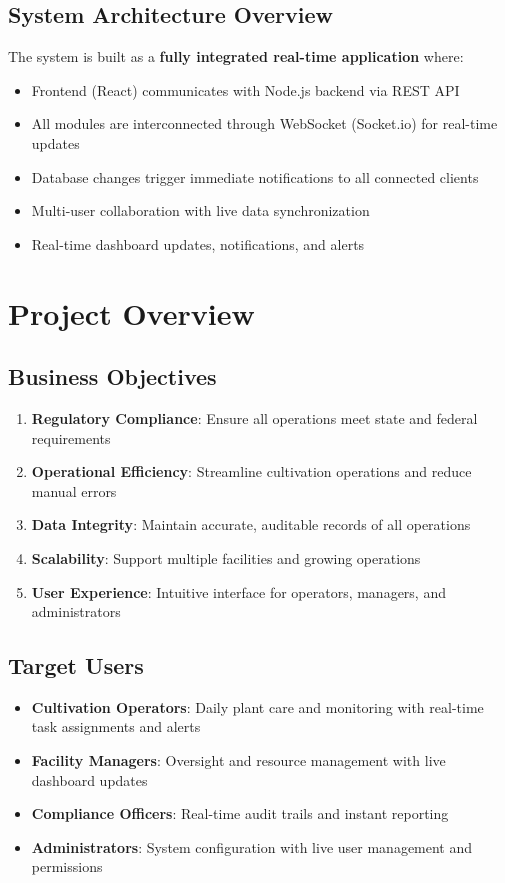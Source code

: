 \documentclass[11pt,a4paper]{article}
\begin{document}
\subsection*{System Architecture Overview}
\begin{highlightbox}
The system is built as a \textbf{fully integrated real-time application} where:
\begin{itemize}
    \item Frontend (React) communicates with Node.js backend via REST API
    \item All modules are interconnected through WebSocket (Socket.io) for real-time updates
    \item Database changes trigger immediate notifications to all connected clients
    \item Multi-user collaboration with live data synchronization
    \item Real-time dashboard updates, notifications, and alerts
\end{itemize}
\end{highlightbox}

\section{Project Overview}

\subsection{Business Objectives}
\begin{enumerate}
    \item \textbf{Regulatory Compliance}: Ensure all operations meet state and federal requirements
    \item \textbf{Operational Efficiency}: Streamline cultivation operations and reduce manual errors
    \item \textbf{Data Integrity}: Maintain accurate, auditable records of all operations
    \item \textbf{Scalability}: Support multiple facilities and growing operations
    \item \textbf{User Experience}: Intuitive interface for operators, managers, and administrators
\end{enumerate}

\subsection{Target Users}
\begin{itemize}
    \item \textbf{Cultivation Operators}: Daily plant care and monitoring with real-time task assignments and alerts
    \item \textbf{Facility Managers}: Oversight and resource management with live dashboard updates
    \item \textbf{Compliance Officers}: Real-time audit trails and instant reporting
    \item \textbf{Administrators}: System configuration with live user management and permissions
\end{itemize}
\end{document}
